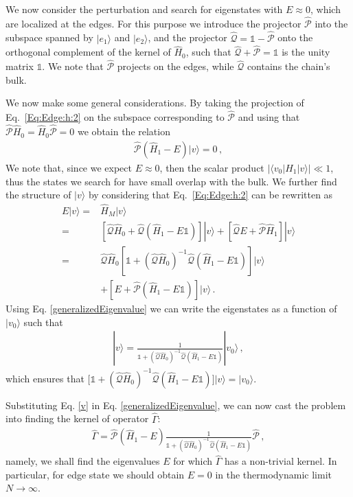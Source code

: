 \documentclass[pra,twocolumn,
superscriptaddress,
showpacs,
aps
]{revtex4-1}
\begin{document}
We now consider the perturbation and search for eigenstates with $E\approx 0$, which are localized at the edges. For this purpose we introduce the projector $\hat{\mathcal P}$ into the subspace spanned by $|e_1\rangle$ and $|e_2\rangle$, and the projector $\hat{\mathcal Q}=\mathbb{1}-\hat{\mathcal P}$ onto the orthogonal complement of the kernel of $\hat{H}_0$, such that $\hat{\mathcal Q}+\hat{\mathcal P}={\mathbb{1}}$ is the unity matrix $\mathbb{1}$. We note that $\hat{\mathcal P}$ projects on the edges, while $\hat{\mathcal Q}$ contains the chain's bulk.

We now make some general considerations. By taking the projection of Eq.~\eqref{Eq:Edge:h:2} on the subspace corresponding to $\hat{\mathcal P}$ and using that $\hat{\mathcal P}\hat H_0=\hat H_0\hat{\mathcal P}=0$ we obtain the relation 
\begin{align}
\hat{\mathcal P}(\hat H_1-E)|v\rangle=0\,,\label{generalizedEigenvalue}
\end{align} 
We note that, since we expect $E\approx 0$, then the scalar product $|\langle v_0|\hat H_1|v\rangle|\ll 1$, thus the states we search for have small overlap with the bulk. We further find the structure of $|v\rangle$ by considering that Eq.~\eqref{Eq:Edge:h:2} can be rewritten as
\begin{align*}
 E|v\rangle=&\hat H_M|v\rangle\\
=&\left[\hat{\mathcal Q}\hat H_0+\hat{\mathcal Q}(\hat{H}_1-E \mathbb{1})\right]|v\rangle+[\hat{\mathcal Q}E+\hat{\mathcal P}\hat{H}_1]|v\rangle\\
=&\hat{\mathcal Q}\hat H_0\left[\mathbb{1}+(\hat{\mathcal Q}\hat{H}_0)^{-1}\hat{\mathcal Q}(\hat{H}_1-E\mathbb{1})\right]|v\rangle\\
&+[E+\hat{\mathcal P}(\hat{H}_1-E\mathbb{1})]|v\rangle
\,.
\end{align*}
Using Eq. \eqref{generalizedEigenvalue} we can write the eigenstates as a function of $|v_0\rangle$ such that
\begin{align}
|v\rangle=\frac{1}{\mathbb{1}+(\hat{\mathcal{Q}}\hat{H}_0)^{-1}\hat{\mathcal{Q}}(\hat{H}_1-E\mathbb{1})}|v_0\rangle\,,\label{v}
\end{align}
which ensures that $\big[\mathbb{1}+(\hat{\mathcal Q}\hat{H}_0)^{-1}\hat{\mathcal Q}(\hat{H}_1-E\mathbb{1})\big]|v\rangle=|v_0\rangle$.

Substituting Eq. \eqref{v} in Eq. \eqref{generalizedEigenvalue}, we can now cast the problem into finding the kernel of operator $\hat \Gamma$:
\begin{align}
\hat \Gamma=\hat{\mathcal{P}}(\hat{H}_1-E)\frac{1}{\mathbb{1}+(\hat{\mathcal{Q}}\hat{H}_0)^{-1}\hat{\mathcal{Q}}(\hat{H}_1-E\mathbb{1})}\hat{\mathcal{P}}\,,\label{Gamma}
\end{align}
namely, we shall find the eigenvalues $E$ for which $\hat \Gamma$ has a non-trivial kernel. In particular, for edge state we should obtain $E=0$ in the thermodynamic limit $N\to\infty$.
\end{document}

